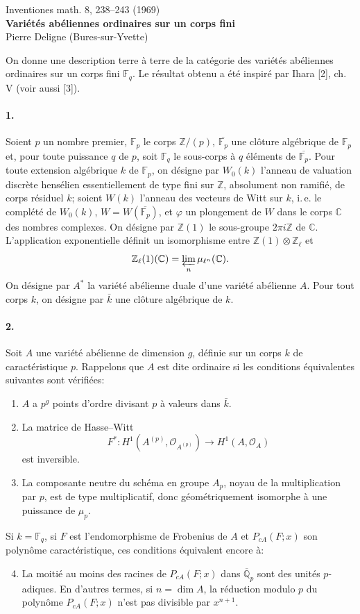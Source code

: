 \documentclass[10pt]{article}
\newcommand{\C}{\mathbb C}
\newcommand{\Fp}{\mathbb F_p}
\newcommand{\Fq}{\mathbb F_q}
\newcommand{\Q}{\mathbb Q}
\newcommand{\Z}{\mathbb Z}
\newcommand{\og}{\guillemotleft}
\newcommand{\fg}{\guillemotright}
\begin{document}
\begin{center}
{\small Inventiones math. 8, 238--243 (1969)}\\[3.0em]
{\Large\bfseries Variétés abéliennes ordinaires sur un corps fini}\\[1.0em]
{\large Pierre Deligne (Bures-sur-Yvette)}
\end{center}

On donne une description terre à terre de la catégorie des variétés abéliennes ordinaires sur un corps fini $\Fq$. Le résultat obtenu a été inspiré par Ihara [2], ch. V (voir aussi [3]).

\paragraph{1.} Soient $p$ un nombre premier, $\Fp$ le corps $\Z/(p)$, $\overline{\Fp}$ une clôture algébrique de $\Fp$ et, pour toute puissance $q$ de $p$, soit $\Fq$ le sous-corps à $q$ éléments de $\overline{\Fp}$. Pour toute extension algébrique $k$ de $\Fp$, on désigne par $W_0(k)$ l'anneau de valuation discrète hensélien essentiellement de type fini sur $\Z$, absolument non ramifié, de corps résiduel $k$; soient $W(k)$ l'anneau des vecteurs de Witt sur $k$, i.\,e. le complété de $W_0(k)$, $W=W(\overline{\Fp})$, et $\varphi$ un plongement de $W$ dans le corps $\C$ des nombres complexes. On désigne par $\Z(1)$ le sous-groupe $2\pi i\Z$ de $\C$. L'application exponentielle définit un isomorphisme entre $\Z(1)\otimes\Z_\ell$ et
\[
\Z_\ell(1)(\C)=\varprojlim_n\mu_{\ell^n}(\C).
\]
On désigne par $A^*$ la variété abélienne duale d'une variété abélienne $A$. Pour tout corps $k$, on désigne par $\bar k$ une clôture algébrique de $k$.

\paragraph{2.} Soit $A$ une variété abélienne de dimension $g$, définie sur un corps $k$ de caractéristique $p$. Rappelons que $A$ est dite ordinaire si les conditions équivalentes suivantes sont vérifiées:
\begin{enumerate}[label=(\Roman*)]
\item $A$ a $p^g$ points d'ordre divisant $p$ à valeurs dans $\bar k$.
\item La \og matrice de Hasse--Witt\fg
\[
F^*:H^1(A^{(p)},\mathcal O_{A^{(p)}})\longrightarrow H^1(A,\mathcal O_A)
\]
est inversible.
\item La composante neutre du schéma en groupe $A_p$, noyau de la multiplication par $p$, est de type multiplicatif, donc géométriquement isomorphe à une puissance de $\mu_p$.
\end{enumerate}
Si $k=\Fq$, si $F$ est l'endomorphisme de Frobenius de $A$ et $P_{cA}(F;x)$ son polynôme caractéristique, ces conditions équivalent encore à:
\begin{enumerate}[label=(\Roman*)]
\setcounter{enumi}{3}
\item La moitié au moins des racines de $P_{cA}(F;x)$ dans $\overline{\Q}_p$ sont des unités $p$-adiques. En d'autres termes, si $n=\dim A$, la réduction modulo $p$ du polynôme $P_{cA}(F;x)$ n'est pas divisible par $x^{n+1}$.
\end{enumerate}
\end{document}

